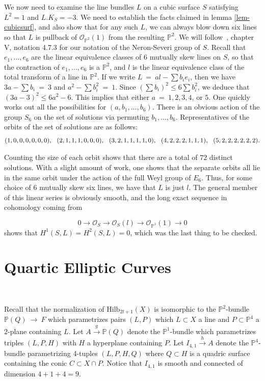 \documentclass[twoside,12pt,reqno]{amsart}
\theoremstyle{plain}
\theoremstyle{definition}
\newcommand{\PP}{\mathbb{P}}
\newcommand{\HI}[2]{\text{Hilb}_{#1}(#2)}
\newcommand{\OO}{\mathcal O}
\renewcommand{\xrightarrow}[1]{\mathbin{\stackrel{#1}{\longrightarrow}}}
\begin{document}
We now need to examine the line bundles $L$ on a cubic surface $S$
satisfying $L^2=1$ and $L.K_S=-3$.  We need to establish the 
facts claimed in lemma \ref{lem-cubicsurf}, and also show that for any such
$L$, we can always blow down six lines so that $L$ is pullback of
$\OO_{\PP^2}(1)$ from the resulting $\PP^2$.
We will follow~\cite{H}, chapter V, notation
4.7.3 for our notation of the Neron-Severi group of $S$.  Recall
that $e_1,\dots,e_6$ are the linear equivalence classes of $6$
mutually skew lines on $S$, so that the contraction of
$e_1,\dots,e_6$ is a $\PP^2$,  and $l$ is the linear equivalence class
of the total transform of a line in $\PP^2$.  If we write
$L~=~al-\sum b_ie_i$, then we have $3a-\sum b_i~=~3$ and $a^2-\sum
b_i^2 ~=~ 1$.  Since $(\sum b_i)^2\leq 6\sum b_i^2$, we deduce that
$(3a-3)^2\leq 6a^2-6$.  This implies that either $a~=~1,2,3,4$, or
$5$.  One quickly works out all the possibilities for
$(a,b_1,\dots,b_6)$.  There is an obvious action of the group $S_6$ on
the set of solutions via permuting $b_1,\dots,b_6$.  Representatives
of the orbits of the set of solutions are as follows:
\begin{equation} (1,0,0,0,0,0,0),\ \ (2,1,1,1,0,0,0),\ \ (3,2,1,1,1,1,0),\ \ 
(4,2,2,2,1,1,1),\ \ (5,2,2,2,2,2,2). \rule[-0.3cm]{0cm}{0.3cm} \end{equation}
Counting the size of each orbit shows that there are a total of $72$ distinct
solutions.  With a slight amount of work, one shows that the separate orbits 
all lie in the same orbit under the action of the full Weyl group of $E_6$.  
Thus, for some choice of $6$ mutually skew six lines, we have that $L$ is
just $l$.  The general member of this linear series is obviously smooth,
and the long exact sequence in cohomology coming from

$$0\longrightarrow \OO_{S}\longrightarrow \OO_{S}(l)\longrightarrow
\OO_{\PP^1}(1)\longrightarrow 0$$
shows that $H^1(S,L)=H^2(S,L)=0$, which was the last thing to be checked.


\section{Quartic Elliptic Curves}~\label{sec-41}

Recall that the normalization of $\HI{2t+1}{X}$ is isomorphic to the
$\PP^2$-bundle $\PP(Q)
~\rightarrow~ F$ which parametrizes pairs $(L,P)$ which $L\subset X$
a line and $P\subset\PP^4$ a $2$-plane containing $L$.    
Let $A\xrightarrow{g} \PP(Q)$ denote the $\PP^1$-bundle
which parametrizes triples $(L,P,H)$ with $H$ a hyperplane containing
$P$.  Let $I_{4,1}\xrightarrow{h} A$ denote the $\PP^4$-bundle parametrizing
4-tuples $(L,P,H,Q)$ where $Q\subset H$ is a quadric surface
containing the conic $C\subset X\cap P$. 
Notice that $I_{4,1}$ is smooth
and connected of dimension $4+1+4=9$.
\end{document}
